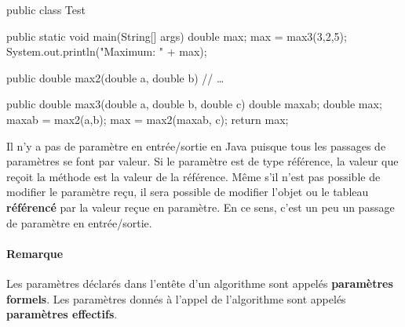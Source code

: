 	\begin{java}
public class Test{
	public static void main(String[] args){
		double max;
		max = max3(3,2,5);
		System.out.println("Maximum: " + max);
	}

	public double max2(double a, double b){
		// …
	}

	public double max3(double a, double b, double c){
		double maxab;
		double max;
		maxab = max2(a,b);
		max = max2(maxab, c);
		return max;
	}
}
	\end{java}

	Il n'y a pas de paramètre en entrée/sortie en Java puisque tous les passages
	de paramètres se font par valeur. Si le paramètre est de type référence, la
	valeur que reçoit la méthode est la valeur de la référence. Même s'il n'est
	pas possible de modifier le paramètre reçu, il sera possible de modifier
	l'objet ou le tableau \textbf{référencé} par la valeur reçue en paramètre.
	En ce sens, c'est un peu un passage de paramètre en entrée/sortie. 

	
	\paragraph{Remarque}
	Les paramètres déclarés dans l’entête d’un algorithme sont appelés
	\textbf{paramètres formels}.  Les paramètres donnés à l’appel de
	l’algorithme sont appelés \textbf{paramètres effectifs}. 
	
	

